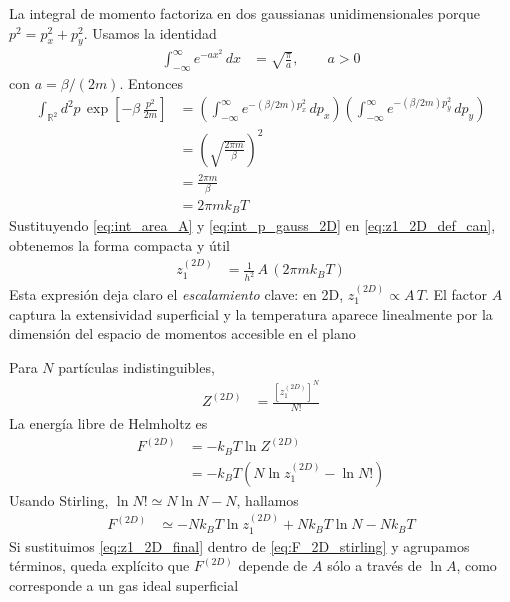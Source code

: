 \documentclass{article}
\begin{document}
La integral de momento factoriza en dos gaussianas unidimensionales porque $p^2=p_x^2+p_y^2$. Usamos la identidad
\begin{equation}
\begin{split}
\int_{-\infty}^{\infty} e^{-a x^2}\,dx
&= \sqrt{\frac{\pi}{a}},\qquad a>0
\end{split}\label{eq:gauss_1D_2D}
\end{equation}
con $a=\beta/(2m)$. Entonces
\begin{equation}
\begin{split}
\int_{\mathbb{R}^2} d^2p\,\exp\!\left[-\beta\,\frac{p^2}{2m}\right]
&= \left(\int_{-\infty}^{\infty}e^{-(\beta/2m)p_x^2}\,dp_x\right)
   \left(\int_{-\infty}^{\infty}e^{-(\beta/2m)p_y^2}\,dp_y\right)\\
&= \left(\sqrt{\frac{2\pi m}{\beta}}\right)^2\\
&= \frac{2\pi m}{\beta}\\
&= 2\pi m k_B T
\end{split}\label{eq:int_p_gauss_2D}
\end{equation}
Sustituyendo \eqref{eq:int_area_A} y \eqref{eq:int_p_gauss_2D} en \eqref{eq:z1_2D_def_can}, obtenemos la forma compacta y útil
\begin{equation}
\begin{split}
z_1^{(2D)}
&= \frac{1}{h^2}\,A\,\left(2\pi m k_B T\right)
\end{split}\label{eq:z1_2D_final}
\end{equation}
Esta expresión deja claro el \textit{escalamiento} clave: en 2D, $z_1^{(2D)}\propto A\,T$. El factor $A$ captura la extensividad superficial y la temperatura aparece linealmente por la dimensión del espacio de momentos accesible en el plano


Para $N$ partículas indistinguibles,
\begin{equation}
\begin{split}
Z^{(2D)}
&= \frac{\left[z_1^{(2D)}\right]^N}{N!}
\end{split}\label{eq:Z_total_2D}
\end{equation}
La energía libre de Helmholtz es
\begin{equation}
\begin{split}
F^{(2D)}
&= -k_B T \ln Z^{(2D)}\\
&= -k_B T \left(N \ln z_1^{(2D)} - \ln N!\right)
\end{split}\label{eq:F_2D_def}
\end{equation}
Usando Stirling, $\ln N!\simeq N\ln N - N$, hallamos
\begin{equation}
\begin{split}
F^{(2D)}
&\simeq -N k_B T \ln z_1^{(2D)} + N k_B T \ln N - N k_B T
\end{split}\label{eq:F_2D_stirling}
\end{equation}
Si sustituimos \eqref{eq:z1_2D_final} dentro de \eqref{eq:F_2D_stirling} y agrupamos términos, queda explícito que $F^{(2D)}$ depende de $A$ sólo a través de $\ln A$, como corresponde a un gas ideal superficial
\end{document}
